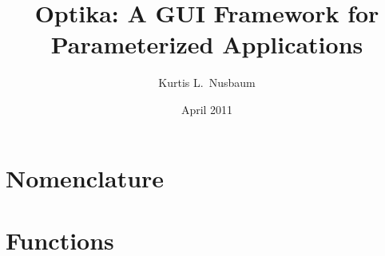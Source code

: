 \documentclass[10pt]{article}
\title{Optika: A GUI Framework for Parameterized Applications}
\date{April 2011}
\author{Kurtis L.\ Nusbaum}
\numberwithin{figure}{section}
\begin{document}


\maketitle

\begin{abstract}

\end{abstract}
\pagebreak
\tableofcontents
\pagebreak


\appendix
\section{Nomenclature}

\section{Functions}
\label{sec:funcs}



\end{document}
